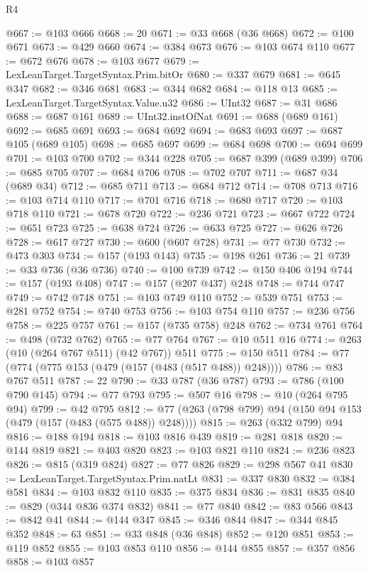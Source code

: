 \begin{lexlean}{R4}
\begin{coremodule}
@667 := @103 @666
@668 := 20
@671 := @33 @668 (@36 @668)
@672 := @100 @671
@673 := @429 @660
@674 := @384 @673
@676 := @103 @674 @110
@677 := @672 @676
@678 := @103 @677
@679 := LexLeanTarget.TargetSyntax.Prim.bitOr
@680 := @337 @679
@681 := @645 @347
@682 := @346 @681
@683 := @344 @682
@684 := @118 @13
@685 := LexLeanTarget.TargetSyntax.Value.u32
@686 := UInt32
@687 := @31 @686
@688 := @687 @161
@689 := UInt32.instOfNat
@691 := @688 (@689 @161)
@692 := @685 @691
@693 := @684 @692
@694 := @683 @693
@697 := @687 @105 (@689 @105)
@698 := @685 @697
@699 := @684 @698
@700 := @694 @699
@701 := @103 @700
@702 := @344 @228
@705 := @687 @399 (@689 @399)
@706 := @685 @705
@707 := @684 @706
@708 := @702 @707
@711 := @687 @34 (@689 @34)
@712 := @685 @711
@713 := @684 @712
@714 := @708 @713
@716 := @103 @714 @110
@717 := @701 @716
@718 := @680 @717
@720 := @103 @718 @110
@721 := @678 @720
@722 := @236 @721
@723 := @667 @722
@724 := @651 @723
@725 := @638 @724
@726 := @633 @725
@727 := @626 @726
@728 := @617 @727
@730 := @600 (@607 @728)
@731 := @77 @730
@732 := @473 @303
@734 := @157 (@193 @143)
@735 := @198 @261
@736 := 21
@739 := @33 @736 (@36 @736)
@740 := @100 @739
@742 := @150 @406 @194
@744 := @157 (@193 @408)
@747 := @157 (@207 @437) @248
@748 := @744 @747
@749 := @742 @748
@751 := @103 @749 @110
@752 := @539 @751
@753 := @281 @752
@754 := @740 @753
@756 := @103 @754 @110
@757 := @236 @756
@758 := @225 @757
@761 := @157 (@735 @758) @248
@762 := @734 @761
@764 := @498 (@732 @762)
@765 := @77 @764
@767 := @10 @511 @16
@774 := @263 (@10 (@264 @767 @511) (@42 @767)) @511
@775 := @150 @511
@784 := @77 (@774 (@775 @153 (@479 (@157 (@483 (@517 @488)) @248))))
@786 := @83 @767 @511
@787 := 22
@790 := @33 @787 (@36 @787)
@793 := @786 (@100 @790 @145)
@794 := @77 @793
@795 := @507 @16
@798 := @10 (@264 @795 @94)
@799 := @42 @795
@812 := @77 (@263 (@798 @799) @94 (@150 @94 @153 (@479 (@157 (@483 (@575 @488)) @248))))
@815 := @263 (@332 @799) @94
@816 := @188 @194
@818 := @103 @816 @439
@819 := @281 @818
@820 := @144 @819
@821 := @403 @820
@823 := @103 @821 @110
@824 := @236 @823
@826 := @815 (@319 @824)
@827 := @77 @826
@829 := @298 @567 @41
@830 := LexLeanTarget.TargetSyntax.Prim.natLt
@831 := @337 @830
@832 := @384 @581
@834 := @103 @832 @110
@835 := @375 @834
@836 := @831 @835
@840 := @829 (@344 @836 @374 @832)
@841 := @77 @840
@842 := @83 @566
@843 := @842 @41
@844 := @144 @347
@845 := @346 @844
@847 := @344 @845 @352
@848 := 63
@851 := @33 @848 (@36 @848)
@852 := @120 @851
@853 := @119 @852
@855 := @103 @853 @110
@856 := @144 @855
@857 := @357 @856
@858 := @103 @857

\end{coremodule}
\end{lexlean}
